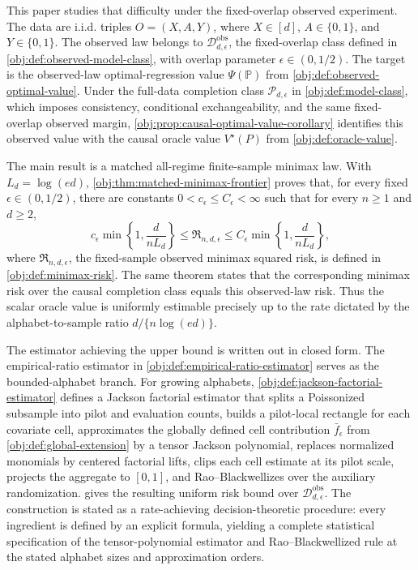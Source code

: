 \documentclass[11pt]{article}
\begin{document}
This paper studies that difficulty under the fixed-overlap observed experiment. The data are i.i.d. triples \(O=(X,A,Y)\), where \(X\in[d]\), \(A\in\{0,1\}\), and \(Y\in\{0,1\}\). The observed law belongs to \(\mathcal D_{d,\epsilon}^{\mathrm{obs}}\), the fixed-overlap class defined in \cref{obj:def:observed-model-class}, with overlap parameter \(\epsilon\in(0,1/2)\). The target is the observed-law optimal-regression value \(\Psi(\mathbb P)\) from \cref{obj:def:observed-optimal-value}. Under the full-data completion class \(\mathcal P_{d,\epsilon}\) in \cref{obj:def:model-class}, which imposes consistency, conditional exchangeability, and the same fixed-overlap observed margin, \cref{obj:prop:causal-optimal-value-corollary} identifies this observed value with the causal oracle value \(V^\star(P)\) from \cref{obj:def:oracle-value}.

The main result is a matched all-regime finite-sample minimax law. With \(L_d=\log(ed)\), \cref{obj:thm:matched-minimax-frontier} proves that, for every fixed \(\epsilon\in(0,1/2)\), there are constants \(0<c_\epsilon\le C_\epsilon<\infty\) such that for every \(n\ge1\) and \(d\ge2\),
\[
c_\epsilon \min\left\{1,\frac{d}{nL_d}\right\}
\le
\mathfrak R_{n,d,\epsilon}
\le
C_\epsilon \min\left\{1,\frac{d}{nL_d}\right\},
\]
where \(\mathfrak R_{n,d,\epsilon}\), the fixed-sample observed minimax squared risk, is defined in \cref{obj:def:minimax-risk}. The same theorem states that the corresponding minimax risk over the causal completion class equals this observed-law risk. Thus the scalar oracle value is uniformly estimable precisely up to the rate dictated by the alphabet-to-sample ratio \(d/\{n\log(ed)\}\).

The estimator achieving the upper bound is written out in closed form. The empirical-ratio estimator in \cref{obj:def:empirical-ratio-estimator} serves as the bounded-alphabet branch. For growing alphabets, \cref{obj:def:jackson-factorial-estimator} defines a Jackson factorial estimator that splits a Poissonized subsample into pilot and evaluation counts, builds a pilot-local rectangle for each covariate cell, approximates the globally defined cell contribution \(\bar f_\epsilon\) from \cref{obj:def:global-extension} by a tensor Jackson polynomial, replaces normalized monomials by centered factorial lifts, clips each cell estimate at its pilot scale, projects the aggregate to \([0,1]\), and Rao--Blackwellizes over the auxiliary randomization.  gives the resulting uniform risk bound over \(\mathcal D_{d,\epsilon}^{\mathrm{obs}}\). The construction is stated as a rate-achieving decision-theoretic procedure: every ingredient is defined by an explicit formula, yielding a complete statistical specification of the tensor-polynomial estimator and Rao--Blackwellized rule at the stated alphabet sizes and approximation orders.
\end{document}
